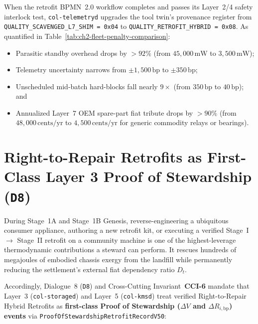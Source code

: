 When the retrofit BPMN~2.0 workflow completes and passes its Layer~2/4 safety interlock test, \texttt{col-telemetryd} upgrades the tool twin's provenance register from \texttt{QUALITY\_SCAVENGED\_L7\_SHIM = 0x04} to \texttt{QUALITY\_RETROFIT\_HYBRID = 0x08}. As quantified in Table~\ref{tab:ch2-fleet-penalty-comparison}:
\begin{itemize}
    \item Parasitic standby overhead drops by $>92\%$ (from $45{,}000\,\mathrm{mW}$ to $3{,}500\,\mathrm{mW}$);
    \item Telemetry uncertainty narrows from $\pm 1{,}500\,\mathrm{bp}$ to $\pm 350\,\mathrm{bp}$;
    \item Unscheduled mid-batch hard-blocks fall nearly $9\times$ (from $350\,\mathrm{bp}$ to $40\,\mathrm{bp}$); and
    \item Annualized Layer~7 OEM spare-part fiat tribute drops by $>90\%$ (from $48{,}000\,\text{cents/yr}$ to $4{,}500\,\text{cents/yr}$ for generic commodity relays or bearings).
\end{itemize}

\section{Right-to-Repair Retrofits as First-Class Layer 3 Proof of Stewardship (\texttt{D8})}
\label{sec:l7-retrofit-stewardship}

During Stage~1A and Stage~1B Genesis, reverse-engineering a ubiquitous consumer appliance, authoring a new retrofit kit, or executing a verified Stage~I $\to$ Stage~II retrofit on a community machine is one of the highest-leverage thermodynamic contributions a steward can perform. It rescues hundreds of megajoules of embodied chassis exergy from the landfill while permanently reducing the settlement's external fiat dependency ratio $D_t$.

Accordingly, Dialogue~8 (\texttt{D8}) and Cross-Cutting Invariant~\textbf{CCI-6} mandate that Layer~3 (\texttt{col-storaged}) and Layer~5 (\texttt{col-kmsd}) treat verified Right-to-Repair Hybrid Retrofits as \textbf{first-class Proof of Stewardship ($\Delta V$ and $\Delta R_{i,\mathrm{bp}}$) events} via \texttt{ProofOfStewardshipRetrofitRecordV50}:

